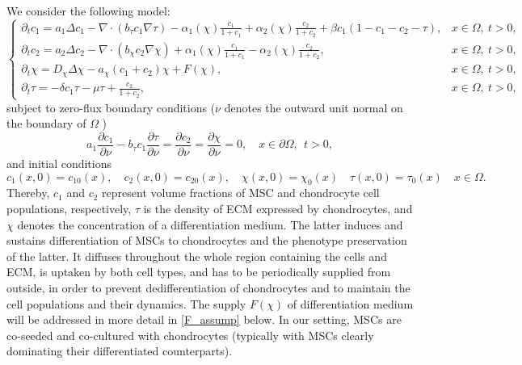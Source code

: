 \documentclass[a4paper,10pt]{article}
\theoremstyle{definition}
\begin{document}
We consider the following model:
  \begin{equation}
  \begin{cases}
  \label{model}
    \partial_t c_1 = a_1 \Delta c_{1} - \nabla \cdot (b_\tau c_1 \nabla \tau) - \alpha_1(\chi) \frac{c_1}{1 + c_1} + \alpha_2(\chi) \frac{c_2}{1 + c_2}  + \beta c_{1}(1 - c_{1} - c_{2} - \tau),                             &  x \in \Omega,\ t > 0,           \\[7pt]
    \partial_t c_2  = a_2 \Delta c_2 - \nabla \cdot (b_\chi c_2 \nabla \chi) + \alpha_1(\chi) \frac{c_1}{1 + c_1} -\alpha_2(\chi) \frac{c_2}{1 + c_2} ,                                                                       &  x \in \Omega,\ t > 0,           \\[7pt]
    \partial_t \chi = D_\chi \Delta \chi - a_\chi (c_1 + c_2) \chi + F(\chi),                                                                                                                      &  x \in \Omega,\ t > 0,           \\[7pt]
    \partial_t \tau = - \delta c_1 \tau - \mu \tau +  \tfrac{c_2}{1 + c_2},                                                                                                                  &  x \in \Omega,\ t > 0,
  \end{cases}
\end{equation}
subject to zero-flux boundary conditions ($\nu$ denotes the outward unit normal on the boundary of $\Omega$ )
\begin{equation}
  \label{boundary_conditions}
  a_1 \frac{\partial c_1}{\partial \nu} - b_\tau c_1 \frac{\partial \tau}{\partial \nu} = \frac{\partial c_2}{\partial \nu} = \frac{\partial \chi}{\partial \nu} = 0,  \quad x \in \partial \Omega, ~~ t > 0,
\end{equation}
and initial conditions
\begin{equation}
  \label{initial_conditions}
  c_1(x, 0) = c_{10}(x), \quad c_2(x, 0) = c_{20}(x), \quad \chi(x, 0) = \chi_0(x) \quad \tau(x, 0) = \tau_0(x) \quad x \in \Omega.
\end{equation}
Thereby, $c_1$ and $c_2$ represent volume fractions of MSC and chondrocyte cell populations, respectively, $\tau$ is the density of ECM expressed by chondrocytes, and $\chi $ denotes the concentration of a differentiation medium. The latter induces and sustains differentiation of MSCs to chondrocytes and the phenotype preservation of the latter. It diffuses throughout the whole region containing the cells and ECM, is uptaken by both cell types, and has to be periodically supplied from outside, in order to prevent dedifferentiation of chondrocytes and to maintain the cell populations and their dynamics.  The supply $F(\chi )$ of differentiation medium  will be addressed in more detail in \eqref{F_assump} below. In our setting, MSCs are co-seeded and co-cultured with chondrocytes (typically with MSCs clearly dominating their differentiated counterparts).\\[-2ex]
\end{document}
